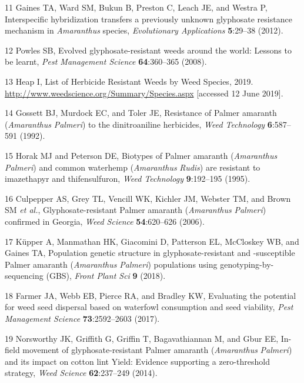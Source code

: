 \documentclass[
  12pt,
  a4paper]{article}
\begin{document}
\leavevmode\hypertarget{ref-gaines_interspecific_2012}{}%
11 Gaines TA, Ward SM, Bukun B, Preston C, Leach JE, and Westra P,
Interspecific hybridization transfers a previously unknown glyphosate
resistance mechanism in \emph{Amaranthus} species, \emph{Evolutionary
Applications} \textbf{5}:29--38 (2012).

\leavevmode\hypertarget{ref-powles_evolved_2008}{}%
12 Powles SB, Evolved glyphosate-resistant weeds around the world:
Lessons to be learnt, \emph{Pest Management Science}
\textbf{64}:360--365 (2008).

\leavevmode\hypertarget{ref-heap_list_2019-1}{}%
13 Heap I, List of Herbicide Resistant Weeds by Weed Species, 2019.
\url{http://www.weedscience.org/Summary/Species.aspx} {[}accessed 12
June 2019{]}.

\leavevmode\hypertarget{ref-gossett_resistance_1992}{}%
14 Gossett BJ, Murdock EC, and Toler JE, Resistance of Palmer amaranth
(\emph{Amaranthus} \emph{Palmeri}) to the dinitroaniline herbicides,
\emph{Weed Technology} \textbf{6}:587--591 (1992).

\leavevmode\hypertarget{ref-horak_biotypes_1995}{}%
15 Horak MJ and Peterson DE, Biotypes of Palmer amaranth
(\emph{Amaranthus} \emph{Palmeri}) and common waterhemp
(\emph{Amaranthus} \emph{Rudis}) are resistant to imazethapyr and
thifensulfuron, \emph{Weed Technology} \textbf{9}:192--195 (1995).

\leavevmode\hypertarget{ref-culpepper_glyphosate-resistant_2006}{}%
16 Culpepper AS, Grey TL, Vencill WK, Kichler JM, Webster TM, and Brown
SM \emph{et al.}, Glyphosate-resistant Palmer amaranth
(\emph{Amaranthus} \emph{Palmeri}) confirmed in Georgia, \emph{Weed
Science} \textbf{54}:620--626 (2006).

\leavevmode\hypertarget{ref-kupper_population_2018}{}%
17 Küpper A, Manmathan HK, Giacomini D, Patterson EL, McCloskey WB, and
Gaines TA, Population genetic structure in glyphosate-resistant and
-susceptible Palmer amaranth (\emph{Amaranthus} \emph{Palmeri})
populations using genotyping-by-sequencing (GBS), \emph{Front Plant Sci}
\textbf{9} (2018).

\leavevmode\hypertarget{ref-farmer_evaluating_2017}{}%
18 Farmer JA, Webb EB, Pierce RA, and Bradley KW, Evaluating the
potential for weed seed dispersal based on waterfowl consumption and
seed viability, \emph{Pest Management Science} \textbf{73}:2592--2603
(2017).

\leavevmode\hypertarget{ref-norsworthy_-field_2014}{}%
19 Norsworthy JK, Griffith G, Griffin T, Bagavathiannan M, and Gbur EE,
In-field movement of glyphosate-resistant Palmer amaranth
(\emph{Amaranthus} \emph{Palmeri}) and its impact on cotton lint Yield:
Evidence supporting a zero-threshold strategy, \emph{Weed Science}
\textbf{62}:237--249 (2014).
\end{document}
